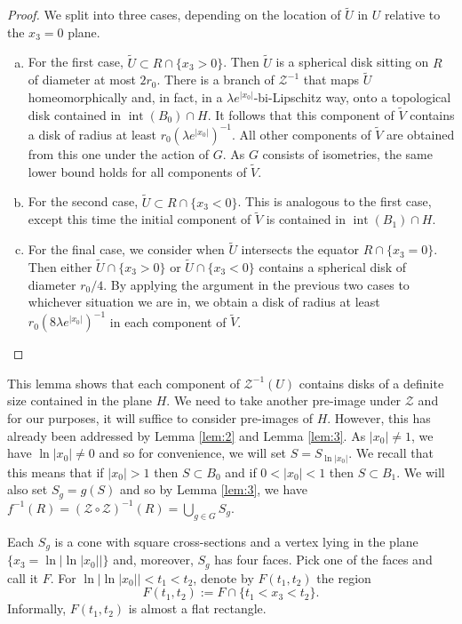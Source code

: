 \documentclass[11pt]{amsart}
\numberwithin{equation}{section}
\theoremstyle{definition}
\theoremstyle{definition}
\theoremstyle{definition}
\begin{document}
\begin{proof}
We split into three cases, depending on the location of $\widetilde{U}$ in $U$ relative to the $x_3=0$ plane.
\begin{enumerate}[(a)]
\item For the first case, $\widetilde{U} \subset R \cap \{ x_3 > 0 \}$. Then $\widetilde{U}$ is a spherical disk sitting on $R$ of diameter at most $2r_0$. There is a branch of $\mathcal{Z}^{-1}$ that maps $\widetilde{U}$ homeomorphically and, in fact, in a $\lambda e^{|x_0|}$-bi-Lipschitz way, onto a topological disk contained in $\operatorname{int}(B_0) \cap H$. It follows that this component of $\widetilde{V}$ contains a disk of radius at least $r_0(\lambda e^{|x_0|})^{-1}$. All other components of $\widetilde{V}$ are obtained from this one under the action of $G$. As $G$ consists of isometries, the same lower bound holds for all components of $\widetilde{V}$.
\item For the second case, $\widetilde{U} \subset R \cap \{x_3 < 0\}$. This is analogous to the first case, except this time the initial component of $\widetilde{V}$ is contained in $\operatorname{int}(B_1) \cap H$.
\item For the final case, we consider when $\widetilde{U}$ intersects the equator $R \cap \{x_3 = 0\}$. Then either $\widetilde{U} \cap \{x_3>0\}$ or $\widetilde{U} \cap \{x_3<0\}$ contains a spherical disk of diameter $r_0/4$. By applying the argument in the previous two cases to whichever situation we are in, we obtain a disk of radius at least $r_0(8\lambda e^{|x_0|})^{-1}$ in each component of $\widetilde{V}$.
\end{enumerate}
\end{proof}

This lemma shows that each component of $\mathcal{Z}^{-1}(U)$ contains disks of a definite size contained in the plane $H$. We need to take another pre-image under $\mathcal{Z}$ and for our purposes, it will suffice to consider pre-images of $H$. However, this has already been addressed by Lemma \ref{lem:2} and Lemma \ref{lem:3}. As $|x_0| \neq 1$, we have $\ln |x_0| \neq 0$ and so for convenience, we will set $S = S_{\ln |x_0|}$. We recall that this means that if $|x_0| >1$ then $S \subset B_0$ and if $0<|x_0|<1$ then $S\subset B_1$. We will also set $S_g = g(S)$ and so by Lemma \ref{lem:3}, we have $f^{-1}(R) = (\mathcal{Z} \circ \mathcal{Z})^{-1}(R) = \bigcup_{g\in G} S_g$.

Each $S_g$ is a cone with square cross-sections and a vertex lying in the plane $\{x_3 = \ln \left |\ln |x_0| \right |\}$ and, moreover, $S_g$ has four faces. Pick one of the faces and call it $F$. For $\ln \left |\ln |x_0| \right | < t_1 <t_2$, denote by $F(t_1,t_2)$ the region
\begin{equation} 
\label{eq:Ftt}
F(t_1,t_2) := F \cap \{ t_1 < x_3 < t_2 \} .
\end{equation}
Informally, $F(t_1,t_2)$ is almost a flat rectangle.
\end{document}
